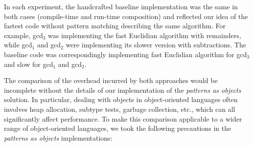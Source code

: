 In each experiment, the handcrafted baseline implementation was the same in 
both cases (compile-time and run-time composition) and reflected our idea of the 
fastest code without pattern matching describing the same algorithm. For 
example, gcd$_3$ was implementing the fast Euclidian algorithm with remainders, 
while gcd$_1$ and gcd$_2$ were implementing its slower version with 
subtractions. The baseline code was correspondingly implementing fast Euclidian 
algorithm for gcd$_3$ and slow for gcd$_1$ and gcd$_2$.

The comparison of the overhead incurred by both approaches would be incomplete 
without the details of our implementation of the \emph{patterns as objects} solution. In particular, 
dealing with objects in object-oriented languages often involves heap allocation, 
subtype tests, garbage collection, etc., which can all significantly affect  
performance. To make this comparison applicable to a wider range of 
object-oriented languages, we took the following precautions in the 
\emph{patterns as objects} implementations:

